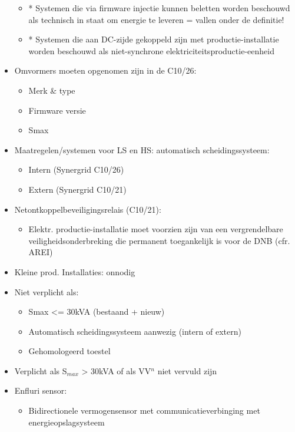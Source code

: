 \documentclass[12pt]{article}
\begin{document}
\begin{itemize}
\begin{itemize}
        \item * Systemen die via firmware injectie kunnen beletten worden beschouwd
        als technisch in staat om energie te leveren = vallen onder de definitie!
        \item * Systemen die aan DC-zijde gekoppeld zijn met productie-installatie worden
        beschouwd als niet-synchrone elektriciteitsproductie-eenheid
    \end{itemize}
    \item Omvormers moeten opgenomen zijn in de C10/26:\begin{itemize}
        \item Merk \& type
        \item Firmware versie
        \item Smax
    \end{itemize}
    \item Maatregelen/systemen voor LS en HS: automatisch scheidingssysteem:\begin{itemize}
        \item Intern (Synergrid C10/26) 
        \item Extern (Synergrid C10/21)
    \end{itemize}
    \item Netontkoppelbeveiligingsrelais (C10/21):\begin{itemize}
        \item Elektr. productie-installatie moet voorzien zijn van een vergrendelbare
        veiligheidsonderbreking die permanent toegankelijk is voor de DNB (cfr. AREI)
    \end{itemize}
    \item Kleine prod. Installaties: onnodig 
    \item Niet verplicht als:\begin{itemize}
        \item Smax <= 30kVA (bestaand + nieuw)
        \item Automatisch scheidingssysteem aanwezig (intern of extern)
        \item Gehomologeerd toestel
    \end{itemize}
    \item Verplicht als S$_{max}$ > 30kVA of als VV$^n$ niet vervuld zijn
    \item Enfluri sensor:\begin{itemize}
        \item Bidirectionele vermogensensor met communicatieverbinging met energieopslagsysteem
    \end{itemize}

\end{itemize}
\end{document}
